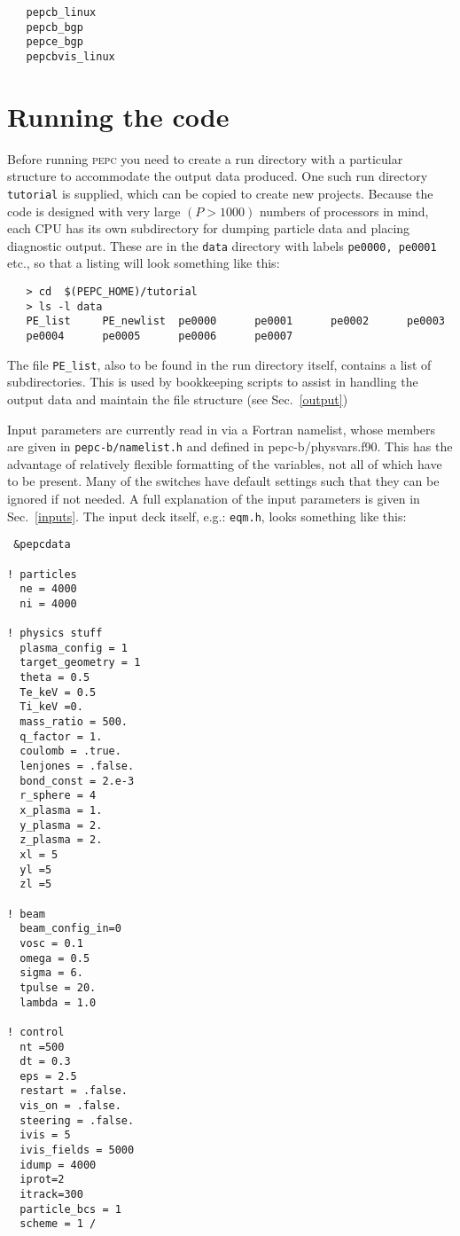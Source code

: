 \documentclass[11pt,psfig]{article}
\begin{document}
\begin{verbatim}
   pepcb_linux
   pepcb_bgp
   pepce_bgp
   pepcbvis_linux
\end{verbatim}


\section{Running the code}

Before running \textsc{pepc} you need to create a run directory with a
particular structure to accommodate the output data produced.  One such run
directory {\tt tutorial} is supplied, which can be copied to create new
projects. Because the
code is designed with very large $(P>1000)$ numbers of processors in mind,
each CPU has its own subdirectory for dumping particle data and placing
diagnostic output.  These are in the {\tt data} directory with labels
{\tt pe0000, pe0001} etc., so that a listing will look something like this:
\begin{verbatim}
   > cd  $(PEPC_HOME)/tutorial
   > ls -l data
   PE_list     PE_newlist  pe0000      pe0001      pe0002      pe0003  
   pe0004      pe0005      pe0006      pe0007
\end{verbatim}

\noindent 
The file {\tt PE\_list}, also to be found in the run directory itself, contains
a list of subdirectories.  This is used by bookkeeping scripts to assist in handling the
output data and maintain the file structure (see Sec.~\ref{output})



\medskip\noindent
Input parameters are currently read in via a Fortran namelist, whose members
are given in {\tt pepc-b/namelist.h} and defined in pepc-b/physvars.f90.  This has the advantage of relatively
flexible formatting of the variables, not all of which have to be present.
Many of the switches have default settings such that they can be ignored if
not needed.  A full explanation of the input parameters is given in
Sec.~\ref{inputs}. The input deck itself, e.g.: {\tt eqm.h}, looks something
like this:

\small
\begin{verbatim}
 &pepcdata

! particles
  ne = 4000
  ni = 4000

! physics stuff
  plasma_config = 1  
  target_geometry = 1   
  theta = 0.5
  Te_keV = 0.5 
  Ti_keV =0.
  mass_ratio = 500.
  q_factor = 1.
  coulomb = .true.
  lenjones = .false.
  bond_const = 2.e-3
  r_sphere = 4
  x_plasma = 1.    
  y_plasma = 2.     
  z_plasma = 2.     
  xl = 5  
  yl =5
  zl =5

! beam
  beam_config_in=0  
  vosc = 0.1
  omega = 0.5
  sigma = 6.
  tpulse = 20.
  lambda = 1.0   

! control
  nt =500
  dt = 0.3
  eps = 2.5
  restart = .false.
  vis_on = .false.
  steering = .false.
  ivis = 5
  ivis_fields = 5000
  idump = 4000
  iprot=2
  itrack=300
  particle_bcs = 1
  scheme = 1 /
\end{verbatim}
\end{document}
